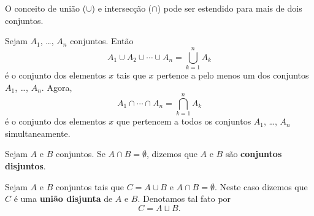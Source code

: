 O conceito de união ($ \cup $) e intersecção ($ \cap $) pode ser estendido para mais de dois conjuntos.

\begin{definicao}
    Sejam $A_{1}$, \dots, $A_{n}$ conjuntos. Então
    \[
        A_{1} \cup A_{2} \cup \cdots \cup A_{n}= \displaystyle\bigcup_{k=1}^n A_{k}
    \]
    é o conjunto dos elementos $x$ tais que $x$ pertence a pelo menos um dos conjuntos $A_{1}$, \dots, $A_{n}$. Agora,
    \[
        A_{1} \cap \cdots \cap A_{n} = \displaystyle\bigcap_{k=1}^{n}A_{k}
    \]
    é o conjunto dos elementos $x$ que pertencem a todos os conjuntos $A_{1}$, \dots, $A_{n}$ simultaneamente.
\end{definicao}

\begin{definicao}
    Sejam $A$ e $B$ conjuntos. Se $A \cap B = \emptyset$, dizemos que $A$ e $B$ são \textbf{conjuntos disjuntos}.
\end{definicao}


Sejam $A$ e $B$ conjuntos tais que $C = A \cup B$ e $A \cap B = \emptyset$. Neste caso dizemos que $C$ é uma \textbf{união disjunta} de $A$ e $B$. Denotamos tal fato por
\[
    C = A \sqcup B.
\]


